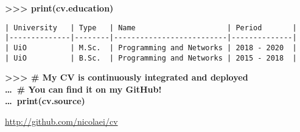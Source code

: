 \documentclass{minimal}
\newcommand{\keyword}[1]{\textcolor{keyword}{#1}}
\newcommand{\comment}[1]{\textcolor{comment}{\# #1}}
\newcommand{\repl}[1]{\textbf{\textcolor{repl}{>{}>{}>} #1 \\}}
\newcommand{\replcont}[1]{\textbf{\textcolor{repl}{\ldots}\ #1 \\}}
\begin{document}
    \repl{\keyword{print}(cv.education)}

    \begin{verbatim}
| University   | Type   | Name                     | Period       |
|--------------|--------|--------------------------|--------------|
| UiO          | M.Sc.  | Programming and Networks | 2018 - 2020  |
| UiO          | B.Sc.  | Programming and Networks | 2015 - 2018  |
    \end{verbatim}

    \repl{\comment{My CV is continuously integrated and deployed}}
    \replcont{\comment{You can find it on my GitHub!}}
    \replcont{\keyword{print}(cv.source)}

    \url{http://github.com/nicolaei/cv}
\end{document}
